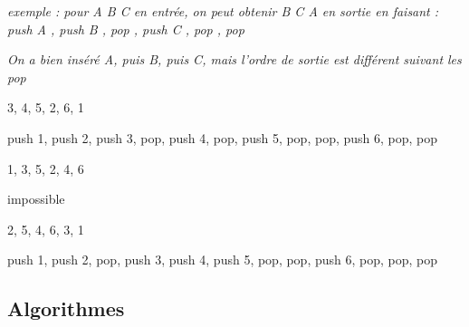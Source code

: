 \documentclass[11pt,a4paper]{article}
\begin{document}
\smallskip

\begin{center}
\noindent \textit{exemple : pour \og A B C \fg{} en entrée, on peut obtenir \og B C A \fg{} en sortie en faisant : \linebreak
\og push A \fg, \og push B \fg, \og pop \fg, \og push C \fg, \og pop \fg, \og pop \fg }

\noindent \textit{On a bien inséré A, puis B, puis C, mais l'ordre de sortie est différent suivant les \og pop \fg}
\end{center}


\begin{center}

\begin{large}
3, 4, 5, 2, 6, 1
\end{large}

\begin{center}
 push 1, push 2, push 3, pop, push 4, pop, push 5, pop, pop, push 6, pop, pop
\end{center}

\vspace*{3cm}

\begin{large}
1, 3, 5, 2, 4, 6
\end{large}

\begin{center}
 impossible
\end{center}

\vspace*{3cm}

\begin{large}
2, 5, 4, 6, 3, 1
\end{large}

\begin{center}
 push 1, push 2, pop, push 3, push 4, push 5, pop, pop, push 6, pop, pop, pop
\end{center}

\end{center}



\clearpage

\subsection*{Algorithmes}
\end{document}
